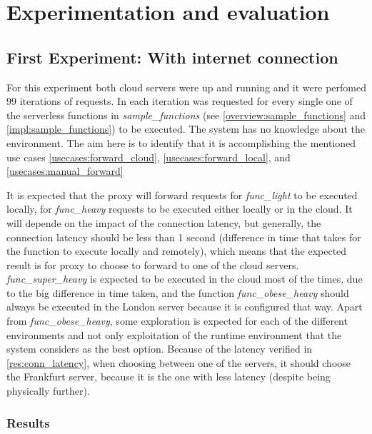 \documentclass[conference]{IEEEtran}
\begin{document}
\section{Experimentation and evaluation}

\subsection{First Experiment: With internet connection}
For this experiment both cloud servers were up and running and it were perfomed
99 iterations of requests. In each iteration was requested for every single one
of the serverless functions in \textit{sample\_functions} (see
\ref{overview:sample_functions} and \ref{impl:sample_functions}) to be executed.
The system has no knowledge about the environment. The aim here is to identify
that it is accomplishing the mentioned use cases \ref{usecases:forward_cloud},
\ref{usecases:forward_local}, and \ref{usecases:manual_forward}


It is expected that the proxy will forward requests for \textit{func\_light} to be
executed locally, for \textit{func\_heavy} requests to be executed either locally
or in the cloud. It will depende on the impact of the connection latency, but
generally, the connection latency should be less than 1 second (difference in time
that takes for the function to execute locally and remotely), which means that the
expected result is for proxy to choose to forward to one of the cloud servers.
\textit{func\_super\_heavy} is expected to be executed in the cloud most of the
times, due to the big difference in time taken, and the function
\textit{func\_obese\_heavy} should always be executed in the London server because
it is configured that way. Apart from \textit{func\_obese\_heavy}, some
exploration is expected for each of the different environments and not only
exploitation of the runtime environment that the system considers as the best
option. Because of the latency verified in \ref{res:conn_latency}, when choosing
between one of the servers, it should choose the Frankfurt server, because it is
the one with less latency (despite being physically further).

\subsubsection{Results}
\end{document}
